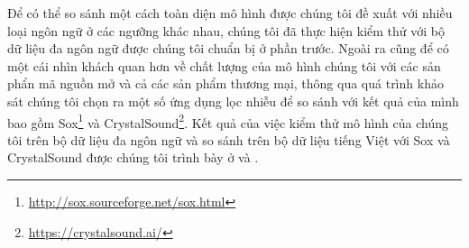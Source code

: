 	
	Để có thể so sánh một cách toàn diện mô hình được chúng tôi đề xuất với nhiều loại ngôn ngữ ở các ngưỡng  khác nhau, chúng tôi đã thực hiện kiểm thử với bộ dữ liệu đa ngôn ngữ được chúng tôi chuẩn bị ở phần trước. Ngoài ra cũng để có một cái nhìn khách quan hơn về chất lượng của mô hình chúng tôi với các sản phẩn mã nguồn mở và cả các sản phẩm thương mại, thông qua quá trình khảo sát chúng tôi chọn ra một số ứng dụng lọc nhiễu để so sánh với kết quả của mình bao gồm Sox\footnote{\url{http://sox.sourceforge.net/sox.html}} và CrystalSound\footnote{\url{https://crystalsound.ai/}}. Kết quả của việc kiểm thử mô hình của chúng tôi trên bộ dữ liệu đa ngôn ngữ và so sánh trên bộ dữ liệu tiếng Việt với Sox và CrystalSound được chúng tôi trình bày ở  và .
	
